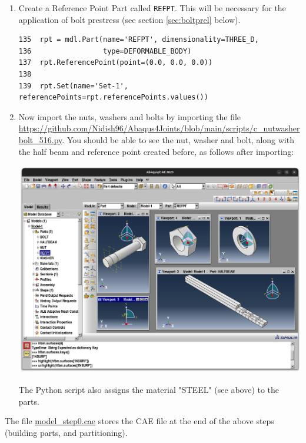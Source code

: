\documentclass[11pt]{article}
\begin{document}
\begin{enumerate}
\item Create a Reference Point Part called \texttt{REFPT}.
This will be necessary for the application of bolt prestress (see section \ref{sec:boltprel} below).
\begin{verbatim}
135  rpt = mdl.Part(name='REFPT', dimensionality=THREE_D, 
136                 type=DEFORMABLE_BODY)
137  rpt.ReferencePoint(point=(0.0, 0.0, 0.0))
138  
139  rpt.Set(name='Set-1', referencePoints=rpt.referencePoints.values())
\end{verbatim}
\item Now import the nuts, washers and bolts by importing the file \url{https://github.com/Nidish96/Abaqus4Joints/blob/main/scripts/c\_nutwasherbolt\_516.py}.
You should be able to see the nut, washer and bolt, along with the half beam and reference point created before, as follows after importing:
\begin{center}
\includegraphics[width=.9\linewidth]{./figs/nwb.png}
\end{center}
The Python script also assigns the material "STEEL" (see above) to the parts.
\end{enumerate}

The file \href{https://github.com/Nidish96/Abaqus4Joints/blob/main/assets/assembly/model\_step0.cae}{model\_step0.cae} stores the CAE file at the end of the above steps (building parts, and partitioning).
\end{document}
